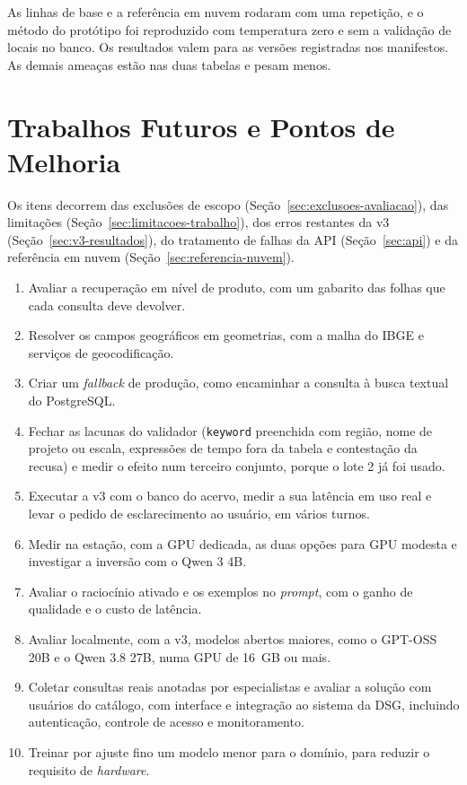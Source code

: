 As linhas de base e a referência em nuvem rodaram com uma repetição, e o método do protótipo foi reproduzido com temperatura zero e sem a validação de locais no banco. Os resultados valem para as versões registradas nos manifestos. As demais ameaças estão nas duas tabelas e pesam menos.

\section{Trabalhos Futuros e Pontos de Melhoria}
\label{sec:trabalhos-futuros}

Os itens decorrem das exclusões de escopo (Seção~\ref{sec:exclusoes-avaliacao}), das limitações (Seção~\ref{sec:limitacoes-trabalho}), dos erros restantes da v3 (Seção~\ref{sec:v3-resultados}), do tratamento de falhas da API (Seção~\ref{sec:api}) e da referência em nuvem (Seção~\ref{sec:referencia-nuvem}).
\begin{enumerate}
  \item Avaliar a recuperação em nível de produto, com um gabarito das folhas que cada consulta deve devolver.
  \item Resolver os campos geográficos em geometrias, com a malha do IBGE e serviços de geocodificação.
  \item Criar um \textit{fallback} de produção, como encaminhar a consulta à busca textual do PostgreSQL.
  \item Fechar as lacunas do validador (\texttt{keyword} preenchida com região, nome de projeto ou escala, expressões de tempo fora da tabela e contestação da recusa) e medir o efeito num terceiro conjunto, porque o lote 2 já foi usado.
  \item Executar a v3 com o banco do acervo, medir a sua latência em uso real e levar o pedido de esclarecimento ao usuário, em vários turnos.
  \item Medir na estação, com a GPU dedicada, as duas opções para GPU modesta e investigar a inversão com o Qwen 3 4B.
  \item Avaliar o raciocínio ativado e os exemplos no \textit{prompt}, com o ganho de qualidade e o custo de latência.
  \item Avaliar localmente, com a v3, modelos abertos maiores, como o GPT-OSS 20B e o Qwen 3.8 27B, numa GPU de 16~GB ou mais.
  \item Coletar consultas reais anotadas por especialistas e avaliar a solução com usuários do catálogo, com interface e integração ao sistema da DSG, incluindo autenticação, controle de acesso e monitoramento.
  \item Treinar por ajuste fino um modelo menor para o domínio, para reduzir o requisito de \textit{hardware}.
\end{enumerate}

